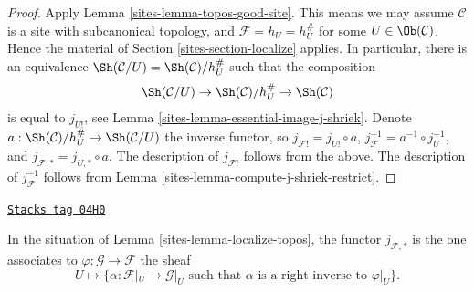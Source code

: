 \begin{proof}

Apply
Lemma \ref{sites-lemma-topos-good-site}.
This means we may assume $\mathcal{C}$ is a site
with subcanonical topology, and $\mathcal{F} = h_U = h_U^\#$
for some $U \in \Ob(\mathcal{C})$.
Hence the material of
Section \ref{sites-section-localize}
applies. In particular, there is an equivalence
$\Sh(\mathcal{C}/U) = \Sh(\mathcal{C})/h_U^\#$
such that the composition
$$
\Sh(\mathcal{C}/U)
\to
\Sh(\mathcal{C})/h_U^\#
\to \Sh(\mathcal{C})
$$
is equal to $j_{U!}$, see
Lemma \ref{sites-lemma-essential-image-j-shriek}.
Denote
$a : \Sh(\mathcal{C})/h_U^\# \to \Sh(\mathcal{C}/U)$
the inverse functor, so $j_{\mathcal{F}!} = j_{U!} \circ a$,
$j_\mathcal{F}^{-1} = a^{-1} \circ j_U^{-1}$, and
$j_{\mathcal{F}, *} = j_{U, *} \circ a$. The description of
$j_{\mathcal{F}!}$ follows from the above. The description of
$j_\mathcal{F}^{-1}$ follows from
Lemma \ref{sites-lemma-compute-j-shriek-restrict}.
\end{proof}

\begin{lemma}
\label{sites-lemma-localize-pushforward}
\href{https://stacks.math.columbia.edu/tag/04H0}{\texttt{Stacks tag 04H0}}

In the situation of Lemma \ref{sites-lemma-localize-topos}, the functor
$j_{\mathcal{F}, *}$ is the one associates to
$\varphi : \mathcal{G} \to \mathcal{F}$ the sheaf
$$
U
\longmapsto
\{\alpha : \mathcal{F}|_U \to \mathcal{G}|_U
\text{ such that } \alpha \text{ is a right inverse to }\varphi|_U \}.
$$
\end{lemma}

